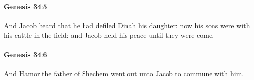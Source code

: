 		\paragraph{Genesis 34:5} %
			\label{GENESIS-34-5}

			And Jacob heard that he had defiled Dinah his daughter: now his sons were with his cattle in the field: and Jacob held his peace until they were come.


		\paragraph{Genesis 34:6} %
			\label{GENESIS-34-6}

			And Hamor the father of Shechem went out unto Jacob to commune with him.


